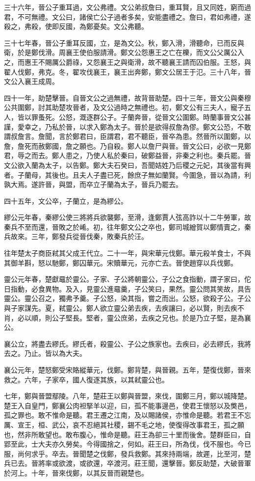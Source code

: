 三十六年，晉公子重耳過，文公弗禮。文公弟叔詹曰，重耳賢，且又同姓，窮而過君，不可無禮。文公曰，諸侯亡公子過者多矣，安能盡禮之。詹曰，君如弗禮，遂殺之，弗殺，使即反國，為鄭憂矣。文公弗聽。

三十七年春，晉公子重耳反國，立，是為文公。秋，鄭入滑，滑聽命，已而反與衛，於是鄭伐滑。周襄王使伯服請滑。鄭文公怨惠王之亡在櫟，而文公父厲公入之，而惠王不賜厲公爵祿，又怨襄王之與衛滑，故不聽襄王請而囚伯服。王怒，與翟人伐鄭，弗克。冬，翟攻伐襄王，襄王出奔鄭，鄭文公居王于氾。三十八年，晉文公入襄王成周。

四十一年，助楚擊晉。自晉文公之過無禮，故背晉助楚。四十三年，晉文公與秦穆公共圍鄭，討其助楚攻晉者，及文公過時之無禮也。初，鄭文公有三夫人，寵子五人，皆以罪蚤死。公怒，溉逐群公子。子蘭奔晉，從晉文公圍鄭。時蘭事晉文公甚謹，愛幸之，乃私於晉，以求入鄭為太子。晉於是欲得叔詹為僇。鄭文公恐，不敢謂叔詹言。詹聞，言於鄭君曰，臣謂君，君不聽臣，晉卒為患。然晉所以圍鄭，以詹，詹死而赦鄭國，詹之願也。乃自殺。鄭人以詹尸與晉。晉文公曰，必欲一見鄭君，辱之而去。鄭人患之，乃使人私於秦曰，破鄭益晉，非秦之利也。秦兵罷。晉文公欲入蘭為太子，以告鄭。鄭大夫石癸曰，吾聞姞姓乃后稷之元妃，其後當有興者。子蘭母，其後也。且夫人子盡已死，餘庶子無如蘭賢。今圍急，晉以為請，利孰大焉。遂許晉，與盟，而卒立子蘭為太子，晉兵乃罷去。

四十五年，文公卒，子蘭立，是為繆公。

繆公元年春，秦繆公使三將將兵欲襲鄭，至滑，逢鄭賈人弦高詐以十二牛勞軍，故秦兵不至而還，晉敗之於崤。初，往年鄭文公之卒也，鄭司城繒賀以鄭情賣之，秦兵故來。三年，鄭發兵從晉伐秦，敗秦兵於汪。

往年楚太子商臣弒其父成王代立。二十一年，與宋華元伐鄭。華元殺羊食士，不與其御羊斟，怒以馳鄭，鄭囚華元。宋贖華元，元亦亡去。晉使趙穿以兵伐鄭。

靈公元年春，楚獻黿於靈公。子家、子公將朝靈公，子公之食指動，謂子家曰，佗日指動，必食異物。及入，見靈公進黿羹，子公笑曰，果然。靈公問其笑故，具告靈公。靈公召之，獨弗予羹。子公怒，染其指，嘗之而出。公怒，欲殺子公。子公與子家謀先。夏，弒靈公。鄭人欲立靈公弟去疾，去疾讓曰，必以賢，則去疾不肖，必以順，則公子堅長。堅者，靈公庶弟，去疾之兄也。於是乃立子堅，是為襄公。

襄公立，將盡去繆氏。繆氏者，殺靈公、子公之族家也。去疾曰，必去繆氏，我將去之。乃止。皆以為大夫。

襄公元年，楚怒鄭受宋賂縱華元，伐鄭。鄭背楚，與晉親。五年，楚復伐鄭，晉來救之。六年，子家卒，國人復逐其族，以其弒靈公也。

七年，鄭與晉盟鄢陵。八年，楚莊王以鄭與晉盟，來伐，圍鄭三月，鄭以城降楚。楚王入自皇門，鄭襄公肉袒掔羊以迎，曰，孤不能事邊邑，使君王懷怒以及獘邑，孤之罪也。敢不惟命是聽。君王遷之江南，及以賜諸侯，亦惟命是聽。若君王不忘厲、宣王，桓、武公，哀不忍絕其社稷，錫不毛之地，使復得改事君王，孤之願也，然非所敢望也。敢布腹心，惟命是聽。莊王為卻三十里而後舍。楚群臣曰，自郢至此，士大夫亦久勞矣。今得國捨之，何如。莊王曰，所為伐，伐不服也。今已服，尚何求乎。卒去。晉聞楚之伐鄭，發兵救鄭。其來持兩端，故遲，比至河，楚兵已去。晉將率或欲渡，或欲還，卒渡河。莊王聞，還擊晉。鄭反助楚，大破晉軍於河上。十年，晉來伐鄭，以其反晉而親楚也。

